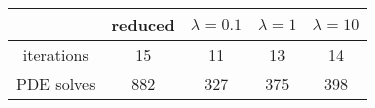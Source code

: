 \begin{tabular}{ccccc}
& reduced & $\lambda = 0.1$ & $\lambda = 1$ & $\lambda = 10$ \\
\hline
iterations & 15 & 11 & 13 & 14 \\
PDE solves & 882 & 327 & 375 & 398 \\
\hline
\end{tabular}
